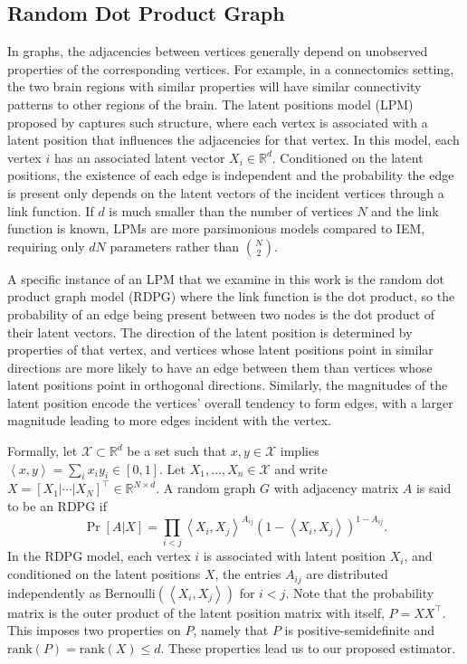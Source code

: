 \documentclass[10pt,letterpaper]{article}
\renewcommand{\Re}{\mathbb{R}}
\begin{document}
\subsection{Random Dot Product Graph}
In graphs, the adjacencies between vertices generally depend on unobserved properties of the corresponding vertices. For example, in a connectomics setting, the two brain regions with similar properties will have similar connectivity patterns to other regions of the brain.
The latent positions model (LPM) proposed by \citet{hoff2002latent} captures such structure, where each vertex is associated with a latent position that influences the adjacencies for that vertex.
In this model, each vertex $i$ has an associated latent vector $X_i \in \Re^d$.
Conditioned on the latent positions, the existence of each edge is independent and the probability the edge is present only depends on the latent vectors of the incident vertices through a link function. If $d$ is much smaller than the number of vertices $N$ and the link function is known, LPMs are more parsimonious models compared to IEM, requiring only $dN$ parameters rather than $\binom{N}{2}$.

A specific instance of an LPM that we examine in this work is the random dot product graph model (RDPG) \citep{young2007random, nickel2007random} where the link function is the dot product, so the probability of an edge being present between two nodes is the dot product of their latent vectors.
The direction of the latent position is determined by properties of that vertex, and vertices whose latent positions point in similar directions are more likely to have an edge between them than vertices whose latent positions point in orthogonal directions.
Similarly, the magnitudes of the latent position encode the vertices' overall tendency to form edges, with a larger magnitude leading to more edges incident with the vertex.

Formally, let $\mathcal{X} \subset \Re^d$ be a set such that $x, y \in \mathcal{X}$ implies $\left \langle  x,y \right \rangle =\sum_i x_i y_i \in [0, 1]$.
Let $X_1,\dotsc,X_n\in \mathcal{X}$ and write $X = [X_1|\cdots|X_N]^{\top} \in \Re^{N \times d}$.
A random graph $G$ with adjacency matrix $A$ is said to be an RDPG if
\[
    \Pr[A|X] = \prod_{i<j} \left \langle X_i, X_j \right \rangle^{A_{ij}} \left( 1 - \left \langle X_i, X_j \right \rangle \right)^{1 - A_{ij}}.
\]
In the RDPG model, each vertex $i$ is associated with latent position $X_i$, and conditioned on the latent positions $X$, the entries $A_{ij}$ are distributed independently as $ \text{Bernoulli}(\left \langle X_i, X_j \right \rangle)$ for $i<j$.
Note that the probability matrix is the outer product of the latent position matrix with itself, $P = X X^{\top}$.
This imposes two properties on $P$, namely that $P$ is positive-semidefinite and $\mathrm{rank}(P)=\mathrm{rank}(X)\leq d$.
These properties lead us to our proposed estimator.
\end{document}
